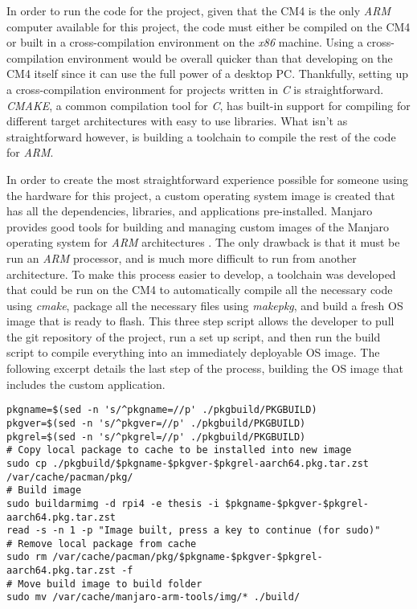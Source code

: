 In order to run the code for the project, given that the CM4 is the only \emph{ARM} computer available for this project, the code must either be compiled on the CM4 or built in a cross-compilation environment on the \emph{x86} machine.
Using a cross-compilation environment would be overall quicker than that developing on the CM4 itself since it can use the full power of a desktop PC.
Thankfully, setting up a cross-compilation environment for projects written in \emph{C} is straightforward.
\emph{CMAKE}, a common compilation tool for \emph{C}, has built-in support for compiling for different target architectures with easy to use libraries.
What isn't as straightforward however, is building a toolchain to compile the rest of the code for \emph{ARM}.

In order to create the most straightforward experience possible for someone using the hardware for this project, a custom operating system image is created that has all the dependencies, libraries, and applications pre-installed.
Manjaro provides good tools for building and managing custom images of the Manjaro operating system for \emph{ARM} architectures \cite{manjaro_arm_tools}.
The only drawback is that it must be run an \emph{ARM} processor, and is much more difficult to run from another architecture.
To make this process easier to develop, a toolchain was developed that could be run on the CM4 to automatically compile all the necessary code using \emph{cmake}, package all the necessary files using \emph{makepkg}, and build a fresh OS image that is ready to flash.
This three step script allows the developer to pull the git repository of the project, run a set up script, and then run the build script to compile everything into an immediately deployable OS image.
The following excerpt details the last step of the process, building the OS image that includes the custom application.

\begin{lstlisting}[style=custombash,firstnumber=72,title=Excerpt from \emph{/code/build.sh}]
pkgname=$(sed -n 's/^pkgname=//p' ./pkgbuild/PKGBUILD)
pkgver=$(sed -n 's/^pkgver=//p' ./pkgbuild/PKGBUILD)
pkgrel=$(sed -n 's/^pkgrel=//p' ./pkgbuild/PKGBUILD)
# Copy local package to cache to be installed into new image
sudo cp ./pkgbuild/$pkgname-$pkgver-$pkgrel-aarch64.pkg.tar.zst /var/cache/pacman/pkg/
# Build image
sudo buildarmimg -d rpi4 -e thesis -i $pkgname-$pkgver-$pkgrel-aarch64.pkg.tar.zst
read -s -n 1 -p "Image built, press a key to continue (for sudo)"
# Remove local package from cache
sudo rm /var/cache/pacman/pkg/$pkgname-$pkgver-$pkgrel-aarch64.pkg.tar.zst -f
# Move build image to build folder
sudo mv /var/cache/manjaro-arm-tools/img/* ./build/
\end{lstlisting}

